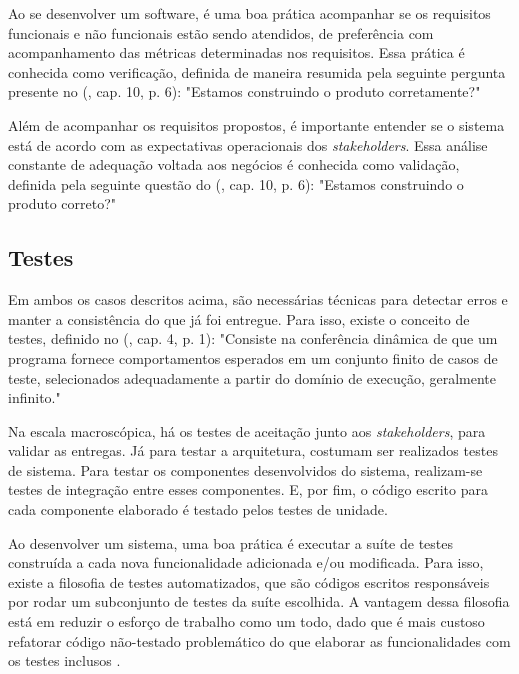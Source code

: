 Ao se desenvolver um software, é uma boa prática acompanhar se os requisitos funcionais e não funcionais estão sendo atendidos, de preferência com acompanhamento das métricas determinadas nos requisitos. Essa prática é conhecida como verificação, definida de maneira resumida pela seguinte pergunta presente no \citeauthor{ieeecomputersociety2014} (\citeyear{ieeecomputersociety2014}, cap. 10, p. 6): "Estamos construindo o produto corretamente?"

Além de acompanhar os requisitos propostos, é importante entender se o sistema está de acordo com as expectativas operacionais dos \textit{stakeholders}. Essa análise constante de adequação voltada aos negócios é conhecida como validação, definida pela seguinte questão do \citeauthor{ieeecomputersociety2014} (\citeyear{ieeecomputersociety2014}, cap. 10, p. 6): "Estamos construindo o produto correto?"

\subsection{Testes}
Em ambos os casos descritos acima, são necessárias técnicas para detectar erros e manter a consistência do que já foi entregue. Para isso, existe o conceito de testes, definido no \citeauthor{ieeecomputersociety2014}  (\citeyear{ieeecomputersociety2014}, cap. 4, p. 1): "Consiste na conferência dinâmica de que um programa fornece comportamentos esperados em um conjunto finito de casos de teste, selecionados adequadamente a partir do domínio de execução, geralmente infinito."

Na escala macroscópica, há os testes de aceitação junto aos \textit{stakeholders}, para validar as entregas. Já para testar a arquitetura, costumam ser realizados testes de sistema. Para testar os componentes desenvolvidos do sistema, realizam-se testes de integração entre esses componentes. E, por fim, o código escrito para cada componente elaborado é testado pelos testes de unidade.

Ao desenvolver um sistema, uma boa prática é executar a suíte de testes construída a cada nova funcionalidade adicionada e/ou modificada. Para isso, existe a filosofia de testes automatizados, que são códigos escritos responsáveis por rodar um subconjunto de testes da suíte escolhida. A vantagem dessa filosofia está em reduzir o esforço de trabalho como um todo, dado que é mais custoso refatorar código não-testado problemático do que elaborar as funcionalidades com os testes inclusos \cite{gerardmeszaros2007}.
